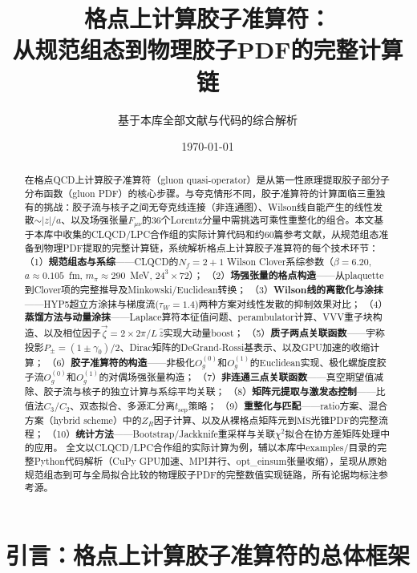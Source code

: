 \documentclass[12pt,a4paper]{ctexart}
\title{\heiti 格点上计算胶子准算符：\\
从规范组态到物理胶子PDF的完整计算链}
\author{基于本库全部文献与代码的综合解析}
\date{\today}
\theoremstyle{definition}
\begin{document}
\maketitle

\begin{abstract}
\noindent
在格点QCD上计算胶子准算符（gluon quasi-operator）是从第一性原理提取胶子部分子分布函数（gluon PDF）的核心步骤。与夸克情形不同，胶子准算符的计算面临三重独有的挑战：胶子流与核子之间无夸克线连接（非连通图）、Wilson线自能产生的线性发散$\sim|z|/a$、以及场强张量$F_{\mu\nu}$的36个Lorentz分量中需挑选可乘性重整化的组合。本文基于本库中收集的CLQCD/LPC合作组的实际计算代码和约60篇参考文献，从规范组态准备到物理PDF提取的完整计算链，系统解析格点上计算胶子准算符的每个技术环节：
（1）\textbf{规范组态与系综}——CLQCD的$N_f=2+1$ Wilson Clover系综参数（$\beta=6.20$, $a\approx0.105$~fm, $m_\pi\approx290$~MeV, $24^3\times72$）；
（2）\textbf{场强张量的格点构造}——从plaquette到Clover项的完整推导及Minkowski/Euclidean转换；
（3）\textbf{Wilson线的离散化与涂抹}——HYP5超立方涂抹与梯度流($\tau_W=1.4$)两种方案对线性发散的抑制效果对比；
（4）\textbf{蒸馏方法与动量涂抹}——Laplace算符本征值问题、perambulator计算、VVV重子块构造、以及相位因子$\vec{\zeta}=2\times 2\pi/L\,\hat{z}$实现大动量boost；
（5）\textbf{质子两点关联函数}——宇称投影$P_\pm=(1\pm\gamma_0)/2$、Dirac矩阵的DeGrand-Rossi基表示、以及GPU加速的收缩计算；
（6）\textbf{胶子准算符的构造}——非极化$O^{(0)}_g$和$O^{(1)}_g$的Euclidean实现、极化螺旋度胶子流$O^{(0)}_g$和$O^{(1)}_g$的对偶场强张量构造；
（7）\textbf{非连通三点关联函数}——真空期望值减除、胶子流与核子的独立计算与系综平均关联；
（8）\textbf{矩阵元提取与激发态控制}——比值法$C_3/C_2$、双态拟合、多源汇分离$t_{\text{sep}}$策略；
（9）\textbf{重整化与匹配}——ratio方案、混合方案（hybrid scheme）中的$Z_R$因子计算、以及从裸格点矩阵元到$\overline{\text{MS}}$光锥PDF的完整流程；
（10）\textbf{统计方法}——Bootstrap/Jackknife重采样与关联$\chi^2$拟合在协方差矩阵处理中的应用。
全文以CLQCD/LPC合作组的实际计算为例，辅以本库中examples/目录的完整Python代码解析（CuPy GPU加速、MPI并行、opt\_einsum张量收缩），呈现从原始规范组态到可与全局拟合比较的物理胶子PDF的完整数值实现链路，所有论据均标注参考源。
\end{abstract}

\tableofcontents
\newpage

\section{引言：格点上计算胶子准算符的总体框架}
\end{document}
